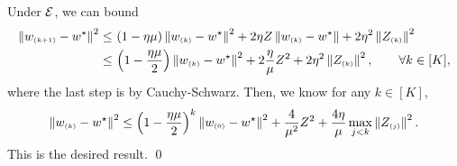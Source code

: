Under $\cE$, we can bound
\begin{align*}
    \nrm{w\iind{k+1}-\us}^2\leq &~
    \paren{ 1-\eta\mu }\nrm{w\iind{k}-\us}^2+2\eta Z\nrm{ w\iind{k}-\us }+2\eta^2 \nrm{Z\iind{k}}^2 \\
    \leq&~ \paren{ 1-\frac{\eta\mu}{2} }\nrm{w\iind{k}-\us}^2 +2\frac{\eta}{\mu}Z^2+2\eta^2 \nrm{Z\iind{k}}^2, \qquad \forall k\in[K],
\end{align*}
where the last step is by Cauchy-Schwarz. Then, we know for any $k\in[K]$,
\begin{align*}
    \nrm{w\iind{k}-\us}^2
    \leq \paren{ 1-\frac{\eta\mu}{2} }^k\nrm{w\iind{0}-\us}^2+\frac{4}{\mu^2}Z^2+\frac{4\eta}{\mu}\max_{j<k}\nrm{Z\iind{j}}^2.
\end{align*}
This is the desired result.
\qed
